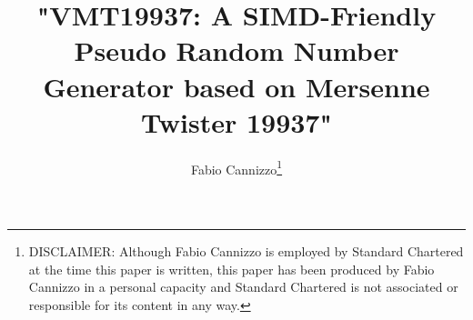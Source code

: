 \documentclass[preprint,1p,times]{elsarticle}
\begin{document}
	
	
	\newcommand {\inred}[1] {\textcolor{red}{#1}}
	\newcommand\XOR{\mathbin{\oplus}}
	\newcommand\OR{\mid}
	\newcommand\AND{\&}
	\newcommand\myceil[1]{\left\lceil{#1}\right\rceil}
	
	
	
	\begin{frontmatter}
		\title{"VMT19937: A SIMD-Friendly Pseudo Random Number Generator based on Mersenne Twister 19937"}
		
		\author{\renewcommand*{\thefootnote}{\fnsymbol{footnote}}
			Fabio Cannizzo\footnote{DISCLAIMER: Although Fabio Cannizzo is employed by Standard Chartered at the time this paper is written, this paper has been produced by Fabio Cannizzo in a personal capacity and Standard Chartered is not associated or responsible for its content in any way.}}
		

\end{frontmatter}
\end{document}
